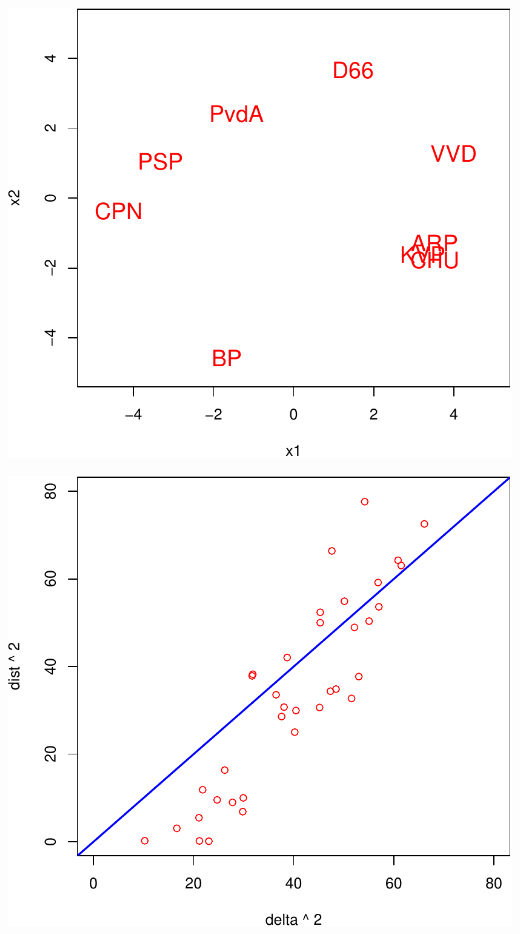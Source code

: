 \documentclass[
  12pt,
  letterpaper,
  DIV=11,
  numbers=noendperiod]{scrreprt}
\theoremstyle{remark}
\begin{document}
\begin{center}
\includegraphics{sstress_files/figure-pdf/alscalgruijter-1.pdf}
\end{center}

\begin{center}
\includegraphics{sstress_files/figure-pdf/alscalgruijter-2.pdf}
\end{center}
\end{document}
